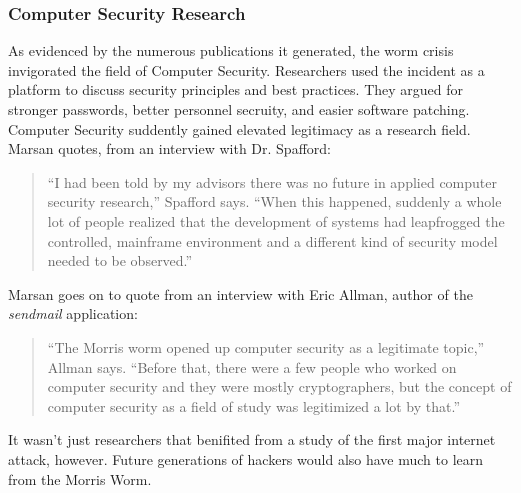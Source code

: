 \subsubsection*{Computer Security Research}
As evidenced by the numerous publications it generated, the worm crisis
invigorated the field of Computer Security.
Researchers used the incident as a platform to discuss
security principles and best practices. They argued for
stronger passwords, better personnel secruity, and
easier software patching\cite{eichin_microscope_1989}.
Computer Security suddently gained elevated legitimacy as a research field.
Marsan\cite{marsan_morris_2008} quotes, from an interview with Dr. Spafford:
\begin{quote}
``I had been told by my advisors there was no future in applied computer
security research,'' Spafford says. ``When this happened, suddenly a whole lot
of people realized that the development of systems had leapfrogged the
controlled, mainframe environment and a different kind of security model needed
to be observed.''
\end{quote}

Marsan\cite{marsan_morris_2008} goes on to quote from an interview with Eric
Allman, author of the \textit{sendmail} application:
\begin{quote}
``The Morris worm opened up computer security as a legitimate topic,'' Allman
says. ``Before that, there were a few people who worked on computer security
and they were mostly cryptographers, but the concept of computer security as a
field of study was legitimized a lot by that.''
\end{quote}

It wasn't just researchers that benifited from a study of the first
major internet attack, however. Future generations of hackers would
also have much to learn from the Morris Worm.
    